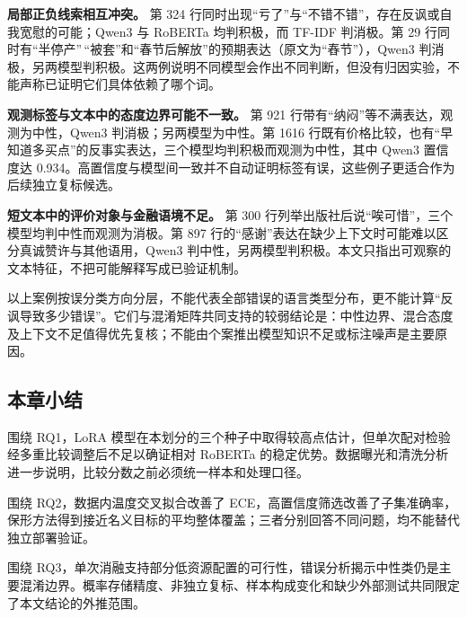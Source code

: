 \textbf{局部正负线索相互冲突。} 第 324 行同时出现``亏了''与``不错不错''，存在反讽或自我宽慰的可能；Qwen3 与 RoBERTa 均判积极，而 TF-IDF 判消极。第 29 行同时有``半停产''\,``被套''和``春节后解放''的预期表达（原文为``舂节''），Qwen3 判消极，另两模型判积极。这两例说明不同模型会作出不同判断，但没有归因实验，不能声称已证明它们具体依赖了哪个词。

\textbf{观测标签与文本中的态度边界可能不一致。} 第 921 行带有``纳闷''等不满表达，观测为中性，Qwen3 判消极；另两模型为中性。第 1616 行既有价格比较，也有``早知道多买点''的反事实表达，三个模型均判积极而观测为中性，其中 Qwen3 置信度达 0.934。高置信度与模型间一致并不自动证明标签有误，这些例子更适合作为后续独立复标候选。

\textbf{短文本中的评价对象与金融语境不足。} 第 300 行列举出版社后说``唉可惜''，三个模型均判中性而观测为消极。第 897 行的``感谢''表达在缺少上下文时可能难以区分真诚赞许与其他语用，Qwen3 判中性，另两模型判积极。本文只指出可观察的文本特征，不把可能解释写成已验证机制。

以上案例按误分类方向分层，不能代表全部错误的语言类型分布，更不能计算``反讽导致多少错误''。它们与混淆矩阵共同支持的较弱结论是：中性边界、混合态度及上下文不足值得优先复核；不能由个案推出模型知识不足或标注噪声是主要原因。

\FloatBarrier\subsection{本章小结}

围绕 RQ1，LoRA 模型在本划分的三个种子中取得较高点估计，但单次配对检验经多重比较调整后不足以确证相对 RoBERTa 的稳定优势。数据曝光和清洗分析进一步说明，比较分数之前必须统一样本和处理口径。

围绕 RQ2，数据内温度交叉拟合改善了 ECE，高置信度筛选改善了子集准确率，保形方法得到接近名义目标的平均整体覆盖；三者分别回答不同问题，均不能替代独立部署验证。

围绕 RQ3，单次消融支持部分低资源配置的可行性，错误分析揭示中性类仍是主要混淆边界。概率存储精度、非独立复标、样本构成变化和缺少外部测试共同限定了本文结论的外推范围。
